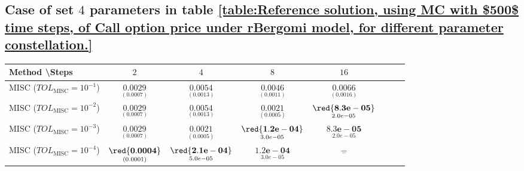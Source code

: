 \FloatBarrier
\subsection{Case of set $4$ parameters in table \ref{table:Reference solution, using MC with $500$ time steps, of Call option price under rBergomi model, for different parameter constellation.}}\label{appendix:Case of set 4 parameters}



\begin{table}[h!]
	\centering
	\begin{tabular}{l*{6}{c}r}
		Method \textbackslash  Steps            & $2$ & $4$ & $8$ & $16$  \\
		\hline
%			
		MISC ($TOL_{\text{MISC}}=10^{-1}$)  & $\underset{(   0.0007)}{\mathbf{   0.0029}}$ & $\underset{(
			
			0.0013)}{\mathbf{     0.0054}}$& $\underset{( 
			0.0011)}{\mathbf{   0.0046}}$  & $\underset{(    0.0016)}{\mathbf{     0.0066
		}}$   \\
%			
		MISC ($TOL_{\text{MISC}}=10^{-2}$)  & $\underset{(   0.0007)}{\mathbf{   0.0029}}$ &$\underset{(
			
			0.0013)}{\mathbf{     0.0054}}$ & $\underset{(0.0005)}{\mathbf{    0.0021
		}}$ &  $\underset{2.0e-05}{\mathbf{\red{8.3e-05}}}$  \\
		MISC ($TOL_{\text{MISC}}=10^{-3}$)  & $\underset{(   0.0007)}{\mathbf{   0.0029}}$ & $\underset{(0.0005
			)}{\mathbf{ 
				0.0021
		}}$ & $\underset{3.0e-05}{\mathbf{\red{1.2e-04}}}$ &  $\underset{2.0e-05}{\mathbf{8.3e-05}}$  \\
		MISC ($TOL_{\text{MISC}}=10^{-4}$)  & $\underset{( 0.0001)}{\mathbf{    \red{0.0004}}}$ & $\underset{5.0e-05}{\mathbf{\red{2.1e-04}}}$& $\underset{3.0e-05}{\mathbf{1.2e-04}}$ & $\underset{-}{\mathbf{-}}$  \\
		
		

\end{tabular}
\end{table}
